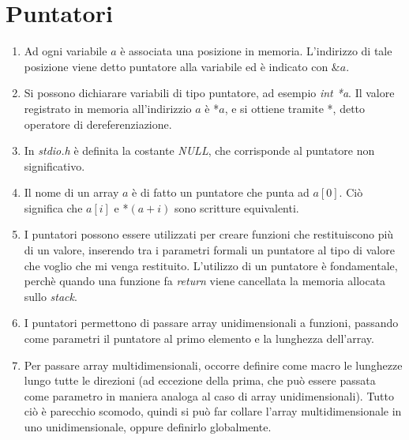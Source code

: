 \documentclass[a4paper,11pt]{article}
\begin{document}
\section{Puntatori}
\begin{enumerate}[resume]
	\item Ad ogni variabile $a$ è associata una posizione in memoria. L'indirizzo di tale posizione viene detto puntatore alla variabile ed è indicato con $\&a$.
	\item Si possono dichiarare variabili di tipo puntatore, ad esempio \textit{int *a}. Il valore registrato in memoria all'indirizzio $a$ è *$a$, e si ottiene tramite *, detto operatore di dereferenziazione.
	\item In \textit{stdio.h} è definita la costante \textit{NULL}, che corrisponde al puntatore non significativo.
	\item Il nome di un array $a$ è di fatto un puntatore che punta ad $a[0]$. Ciò significa che $a[i]$ e *$(a+i)$ sono scritture equivalenti. 
	\item I puntatori possono essere utilizzati per creare funzioni che restituiscono più di un valore, inserendo tra i parametri formali un puntatore al tipo di valore che voglio che mi venga restituito. L'utilizzo di un puntatore è fondamentale, perchè quando una funzione fa \textit{return} viene cancellata la memoria allocata sullo \textit{stack}.
	\item I puntatori permettono di passare array unidimensionali a funzioni, passando come parametri il puntatore al primo elemento e la lunghezza dell'array.
	\item Per passare array multidimensionali, occorre definire come macro le lunghezze lungo tutte le direzioni (ad eccezione della prima, che può essere passata come parametro in maniera analoga al caso di array unidimensionali). Tutto ciò è parecchio scomodo, quindi si può far collare l'array multidimensionale in uno unidimensionale, oppure definirlo globalmente.
\end{enumerate}
\end{document}
